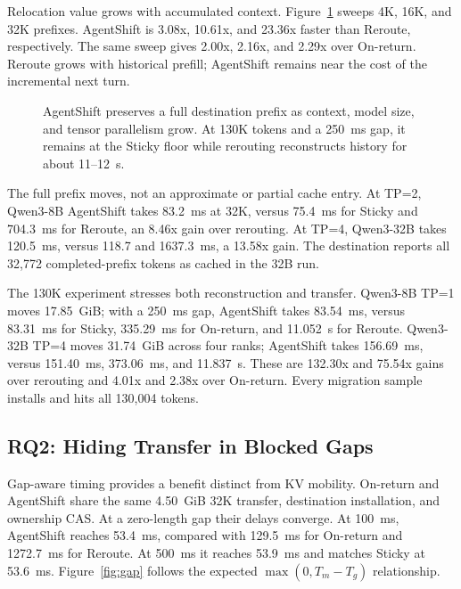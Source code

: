 Relocation value grows with accumulated context. Figure~\ref{fig:core-performance} sweeps 4K, 16K, and 32K prefixes. AgentShift is 3.08x, 10.61x, and 23.36x faster than Reroute, respectively. The same sweep gives 2.00x, 2.16x, and 2.29x over On-return. Reroute grows with historical prefill; AgentShift remains near the cost of the incremental next turn.

\begin{figure}[t]
  \centering
  \caption{AgentShift preserves a full destination prefix as context, model size, and tensor parallelism grow. At 130K tokens and a 250~ms gap, it remains at the Sticky floor while rerouting reconstructs history for about 11--12~s.}
  \label{fig:core-performance}
\end{figure}

The full prefix moves, not an approximate or partial cache entry. At TP=2, Qwen3-8B AgentShift takes 83.2~ms at 32K, versus 75.4~ms for Sticky and 704.3~ms for Reroute, an 8.46x gain over rerouting. At TP=4, Qwen3-32B takes 120.5~ms, versus 118.7 and 1637.3~ms, a 13.58x gain. The destination reports all 32,772 completed-prefix tokens as cached in the 32B run.

The 130K experiment stresses both reconstruction and transfer. Qwen3-8B TP=1 moves 17.85~GiB; with a 250~ms gap, AgentShift takes 83.54~ms, versus 83.31~ms for Sticky, 335.29~ms for On-return, and 11.052~s for Reroute. Qwen3-32B TP=4 moves 31.74~GiB across four ranks; AgentShift takes 156.69~ms, versus 151.40~ms, 373.06~ms, and 11.837~s. These are 132.30x and 75.54x gains over rerouting and 4.01x and 2.38x over On-return. Every migration sample installs and hits all 130,004 tokens.

\subsection{RQ2: Hiding Transfer in Blocked Gaps}\label{rq2-hiding-transfer-in-blocked-gaps}

Gap-aware timing provides a benefit distinct from KV mobility. On-return and AgentShift share the same 4.50~GiB 32K transfer, destination installation, and ownership CAS. At a zero-length gap their delays converge. At 100~ms, AgentShift reaches 53.4~ms, compared with 129.5~ms for On-return and 1272.7~ms for Reroute. At 500~ms it reaches 53.9~ms and matches Sticky at 53.6~ms. Figure~\ref{fig:gap} follows the expected \(\max(0,T_m-T_g)\) relationship.

